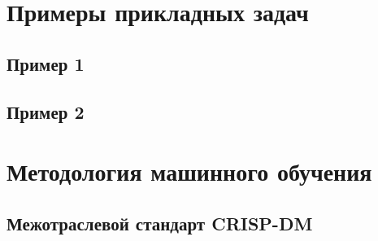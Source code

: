 \documentclass{beamer}
\begin{document}
\section{Примеры прикладных задач}
\subsection{Пример 1}
\begin{frame}
\end{frame}
\subsection{Пример 2}
\begin{frame}
\end{frame}
\section{Методология машинного обучения}
\subsection{Межотраслевой стандарт CRISP-DM}
\begin{frame}
\end{frame}
\end{document}

